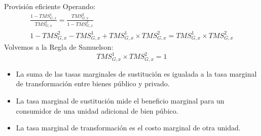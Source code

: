 \begin{frame}{Provisión eficiente}
	Operando:
		\begin{gather*}
			\frac{1 - TMS_{G,x}^1}{TMS_{G,x}^1} = \frac{TMS_{G,x}^2}{1-TMS_{G,x}^2}\\
			1 - TMS_{G,x}^2 - TMS_{G,x}^1 + TMS_{G,x}^1 \times TMS_{G,x}^2 = TMS_{G,x}^1 \times TMS_{G,x}^2
		\end{gather*}
	Volvemos a la  Regla de Samuelson:
		$$TMS_{G,x}^1 \times TMS_{G,x}^2 = 1$$
	\begin{itemize}
		\item La suma de las tasas marginales de sustitución es igualada a la tasa marginal de transformación entre bienes público y privado.
		\item La tasa marginal de sustitución mide el beneficio marginal para un consumidor de una unidad adicional de bien púbico.
		\item La tasa marginal de transformación es el costo marginal de otra unidad.
	\end{itemize}
\end{frame}